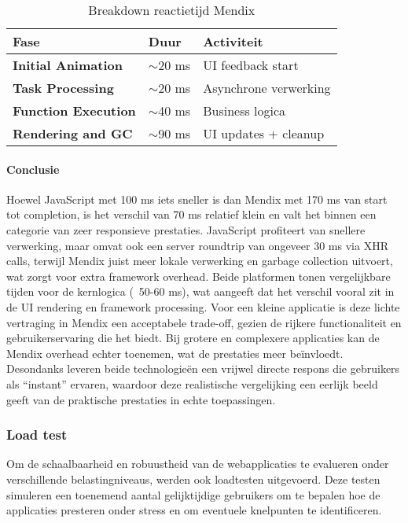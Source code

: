 \begin{table}[H]
    \centering
    \begin{tabular}{ |p{5cm}|p{3cm}|p{6cm}|}
        \hline
        \textbf{Fase} & \textbf{Duur} & \textbf{Activiteit}\\
        \hline
        \textbf{Initial Animation}  & $\sim$20 ms & \gls{UI} feedback start \\
        \hline
        \textbf{Task Processing} & $\sim$20 ms & Asynchrone verwerking \\
        \hline
        \textbf{Function Execution}  & $\sim$40 ms & Business logica \\
        \hline
        \textbf{Rendering and \gls{GC}}  & $\sim$90 ms & \gls{UI} updates + cleanup \\
        \hline                       
        
    \end{tabular}
    \caption[\centering Breakdown reactietijd Mendix]{\label{tab:breakdown Mendix reactietijd}Breakdown reactietijd Mendix}
\end{table}


\pagebreak
\newpage


\paragraph{Conclusie}
Hoewel JavaScript met 100 ms iets sneller is dan Mendix met 170 ms van start tot completion, is het verschil van 70 ms relatief klein en valt het binnen een categorie van zeer responsieve prestaties. JavaScript profiteert van snellere verwerking, maar omvat ook een server roundtrip van ongeveer 30 ms via XHR calls, terwijl Mendix juist meer lokale verwerking en garbage collection uitvoert, wat zorgt voor extra framework overhead. Beide platformen tonen vergelijkbare tijden voor de kernlogica (~50-60 ms), wat aangeeft dat het verschil vooral zit in de UI rendering en framework processing. Voor een kleine applicatie is deze lichte vertraging in Mendix een acceptabele trade-off, gezien de rijkere functionaliteit en gebruikerservaring die het biedt. Bij grotere en complexere applicaties kan de Mendix overhead echter toenemen, wat de prestaties meer beïnvloedt. Desondanks leveren beide technologieën een vrijwel directe respons die gebruikers als “instant” ervaren, waardoor deze realistische vergelijking een eerlijk beeld geeft van de praktische prestaties in echte toepassingen.



\subsubsection{Load test}
Om de schaalbaarheid en robuustheid van de webapplicaties te evalueren onder verschillende belastingniveaus, werden ook loadtesten uitgevoerd. Deze testen simuleren een toenemend aantal gelijktijdige gebruikers om te bepalen hoe de applicaties presteren onder stress en om eventuele knelpunten te identificeren.

